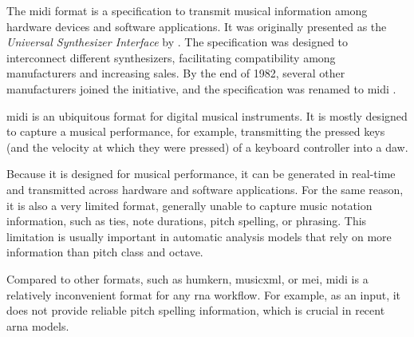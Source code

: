


The \gls{midi} format is a specification to transmit musical
information among hardware devices and software
applications. It was originally presented as the
\emph{Universal Synthesizer Interface} by
\textcite{smith1981universal}. The specification was
designed to interconnect different synthesizers,
facilitating compatibility among manufacturers and
increasing sales. By the end of 1982, several other
manufacturers joined the initiative, and the specification
was renamed to \gls{midi} \parencite{moog1986midi}.


\gls{midi} is an ubiquitous format for digital musical
instruments. It is mostly designed to capture a musical
performance, for example, transmitting the pressed keys (and
the velocity at which they were pressed) of a keyboard
controller into a \gls{daw}.

Because it is designed for musical performance, it can be
generated in real-time and transmitted across hardware and
software applications. For the same reason, it is also a
very limited format, generally unable to capture music
notation information, such as ties, note durations, pitch
spelling, or phrasing. This limitation is usually important
in automatic analysis models that rely on more information
than pitch class and octave.



Compared to other formats, such as \gls{humkern},
\gls{musicxml}, or \gls{mei}, \gls{midi} is a relatively
inconvenient format for any \gls{rna} workflow. For example,
as an input, it does not provide reliable pitch spelling
information, which is crucial in recent \gls{arna} models.

